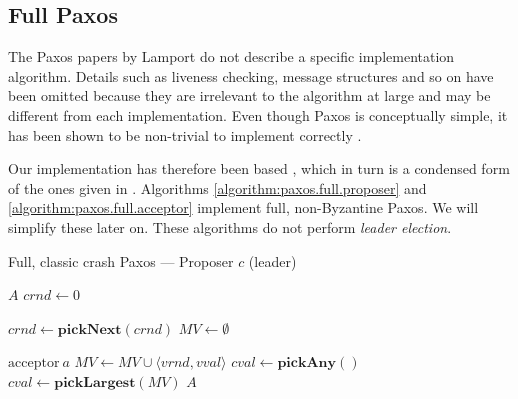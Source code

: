 \subsection{Full Paxos}

The Paxos papers by Lamport \cite{Lamport:1998:PP:279227.279229,Lam01}
do not describe a specific implementation algorithm.
Details such as liveness checking, message structures and so on have
been omitted because they are irrelevant to the algorithm at large and may be
different from each implementation.  Even though Paxos
is conceptually simple, it has been shown to be non-trivial to implement
correctly \cite{Chandra:2007:PML:1281100.1281103}.

Our implementation has therefore been based 
\cite{Insane.Paxos}, which in turn is a condensed form of the ones given in 
\cite{renesse.paxos,Lam01}.
%
Algorithms \ref{algorithm:paxos.full.proposer} and
\ref{algorithm:paxos.full.acceptor} implement full, non-Byzantine Paxos.
We will simplify these later on.  These algorithms do not perform \textit{leader
election}.

\begin{algorithm}
  \caption{Full, classic crash Paxos --- Proposer $c$ (leader)}
  \label{algorithm:paxos.full.proposer}
  \begin{algorithmic}

    \State $A$ 
    \State $crnd \gets 0$ 
    \State

      \State $crnd \gets \textbf{pickNext}(crnd)$ 
      \State $MV \gets \emptyset$ 
      \State {}
    \EndOn
    \State

       {$\text{acceptor}\ a$} 
        \State $MV \gets MV \cup \langle vrnd, vval \rangle$
            \State $cval \gets \textbf{pickAny}()$ 
          \Else
            \State $cval \gets \textbf{pickLargest}(MV)$ 
          \EndIf
         \State {}
                       {$A$}
        \EndIf
      \EndIf
    \EndOn
  \end{algorithmic}
\end{algorithm}

